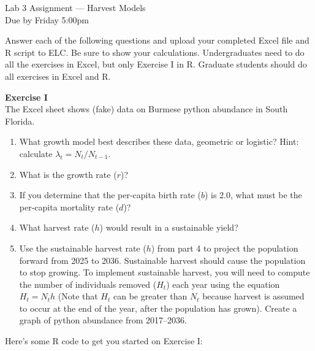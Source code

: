 \documentclass[12pt]{article}\usepackage[]{graphicx}\usepackage[]{xcolor}
\begin{document}
{
  \Large
  \centering
  Lab 3 Assignment --- Harvest Models \\
  Due by Friday 5:00pm \par
}

Answer each of the following questions and upload your completed Excel
file and R script to ELC. Be sure to show your calculations. Undergraduates
need to do all the exercises in Excel, but only Exercise I in
R. Graduate students should do all exercises in Excel and R.  

\vspace{12pt}

{\bf Exercise I \\}
The Excel sheet shows (fake) data on Burmese python abundance in South Florida.
\begin{enumerate}
  \item What growth model best describes these data, geometric or
    logistic?  Hint: calculate $\lambda_t = N_t/N_{t-1}$.
  \item What is the growth rate ($r$)?
  \item If you determine that the per-capita birth rate ($b$) is 2.0,
    what must be the per-capita mortality rate ($d$)?
  \item What harvest rate ($h$) would result in a sustainable yield?
  \item Use the sustainable harvest rate ($h$) from part 4 to project
    the population forward from 2025 to 2036. Sustainable harvest
    should cause the population to stop growing. To implement
    sustainable harvest, you will need to compute the number of
    individuals removed ($H_t$) each year using the equation
    $H_t=N_{t}h$ (Note that $H_t$ can be greater than $N_t$ because
    harvest is assumed to occur at the end of the year, after the 
    population has grown). Create a graph of python abundance from 
    2017--2036.  
\end{enumerate}

\vspace{24pt}

Here's some R code to get you started on Exercise I:
\end{document}
